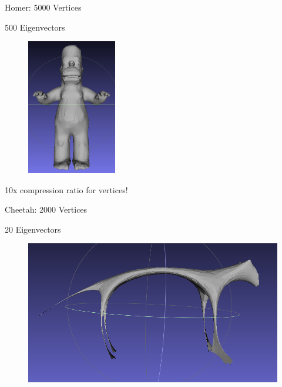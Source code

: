 \documentclass{beamer}
\begin{document}
\begin{frame}{Homer: 5000 Vertices}

500 Eigenvectors
\begin{figure}[t]
    \includegraphics[width=0.35\textwidth]{Harmonics/HomerProjections/Homer500.png}
\end{figure}

10x compression ratio for vertices!

\end{frame}


\begin{frame}{Cheetah: 2000 Vertices}

20 Eigenvectors
\begin{figure}[t]
    \includegraphics[width=\textwidth]{Harmonics/CheetahProjections/CheetahProj20.png}
\end{figure}

\end{frame}
\end{document}
